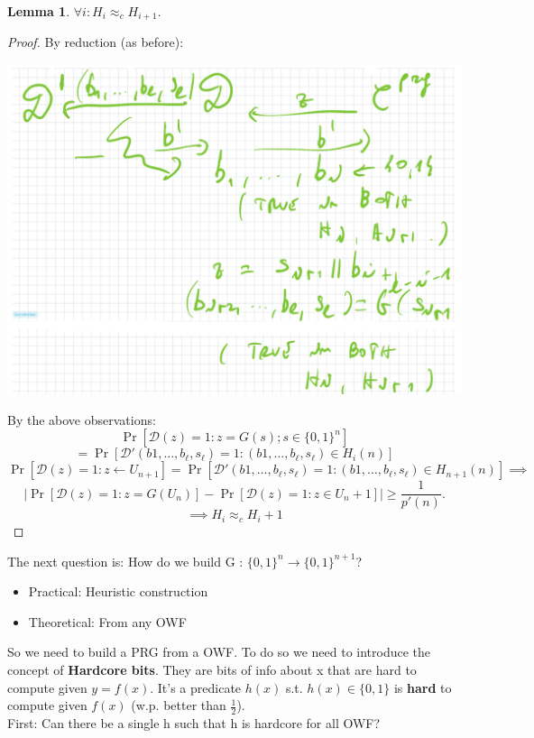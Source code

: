 \documentclass[11pt, a4paper]{article}
\newtheorem{lem}{Lemma}
\begin{document}
\begin{lem}
    $\forall i : H_i \approx_c H_{i+1}$.
\end{lem}
\begin{proof}
    By reduction (as before):
    \begin{center}
        \includegraphics[scale=0.4]{img/Comp_sec/Reduction.png}
    \end{center}
    By the above observations:
    $$\Pr[\mathcal{D}(z) = 1: z = G(s); s \in \{0,1\}^n] $$
    $$= \Pr[\mathcal{D}'(b1,\dots,b_\ell,s_\ell) = 1 : (b1,\dots,b_\ell,s_\ell) \in H_i (n)]$$
    $$ \Pr[\mathcal{D}(z) = 1 : z \leftarrow U_{n+1}] = \Pr[\mathcal{D}' (b1,\dots,b_\ell,s_\ell) = 1 : (b1,\dots,b_\ell,s_\ell) \in H_{n+1}(n)] \implies $$
    $$ |\Pr[\mathcal{D}(z)=1 : z = G(U_n)] - \Pr[\mathcal{D}(z) = 1: z \in U_n+1]| \geq \frac{1}{p'(n)}.$$
    $$\implies H_i \approx_c H_i + 1$$
\end{proof}
The next question is: How do we build G : $\{0,1\}^n \rightarrow \{0,1\}^{n+1}$?\\
\begin{itemize}
    \item Practical: Heuristic construction
    \item Theoretical: From any OWF
\end{itemize}
So we need to build a PRG from a OWF. 
To do so we need to introduce the concept of \textbf{Hardcore bits}. They are bits of info about x that are hard to compute given $y=f(x)$.
It's a predicate $h(x)$ s.t. $h(x) \in \{0,1\}$ is \textbf{hard} to compute given $f(x)$ (w.p. better than $\frac{1}{2}$).\\
First: Can there be a single h such that h is hardcore for all OWF?\\
\end{document}
